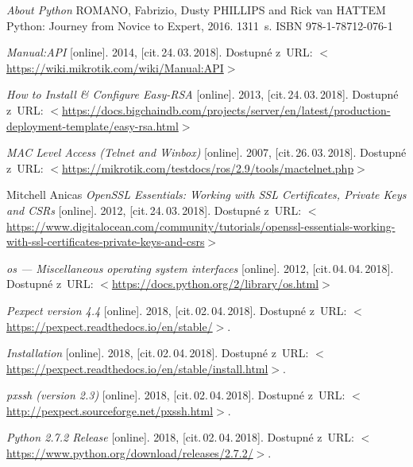 \begin{literatura}{99}

    \emph{About Python}\/
		ROMANO, Fabrizio, Dusty PHILLIPS and Rick van HATTEM
		Python: Journey from Novice to Expert, 2016. 1311~s. ISBN 978-1-78712-076-1

      \emph{Manual:API}\/ [online].
    2014,  [cit.\,24.\,03.\,2018].
    Dostupné z~URL:
    \(<\)\url{https://wiki.mikrotik.com/wiki/Manual:API}\(>\)			
    
      \emph{How to Install & Configure Easy-RSA}\/ [online].
    2013,  [cit.\,24.\,03.\,2018].
    Dostupné z~URL:
    \(<\)\url{https://docs.bigchaindb.com/projects/server/en/latest/production-deployment-template/easy-rsa.html}\(>\)

      \emph{MAC Level Access (Telnet and Winbox)}\/ [online].
    2007,  [cit.\,26.\,03.\,2018].
    Dostupné z~URL:
    \(<\)\url{https://mikrotik.com/testdocs/ros/2.9/tools/mactelnet.php}\(>\)

     Mitchell Anicas \emph{OpenSSL Essentials: Working with SSL Certificates, Private Keys and CSRs}\/ [online].
    2012,  [cit.\,24.\,03.\,2018].
    Dostupné z~URL:
    \(<\)\url{https://www.digitalocean.com/community/tutorials/openssl-essentials-working-with-ssl-certificates-private-keys-and-csrs}\(>\)		

      \emph{os — Miscellaneous operating system interfaces}\/ [online].
    2012,  [cit.\,04.\,04.\,2018].
    Dostupné z~URL:
    \(<\)\url{https://docs.python.org/2/library/os.html}\(>\)		

    \emph{Pexpect version 4.4}\/ [online].
    2018,  [cit.\,02.\,04.\,2018].
    Dostupné z~URL:
    \(<\)\url{https://pexpect.readthedocs.io/en/stable/}\(>\).	
    
    \emph{Installation}\/ [online].
    2018,  [cit.\,02.\,04.\,2018].
    Dostupné z~URL:
    \(<\)\url{https://pexpect.readthedocs.io/en/stable/install.html}\(>\).	
    
    \emph{pxssh (version 2.3)}\/ [online].
    2018,  [cit.\,02.\,04.\,2018].
    Dostupné z~URL:
    \(<\)\url{http://pexpect.sourceforge.net/pxssh.html}\(>\).

    \emph{Python 2.7.2 Release}\/ [online].
    2018,  [cit.\,02.\,04.\,2018].
    Dostupné z~URL:
    \(<\)\url{https://www.python.org/download/releases/2.7.2/}\(>\).	
        

\end{literatura}
